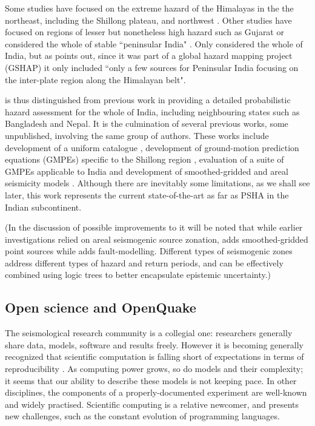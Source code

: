 \documentclass{article}
\begin{document}
Some studies have focused on the extreme hazard of the Himalayas \citep{Bilham2001} in the the northeast, including the Shillong plateau, \citep{Das2006} and northwest \citep{Mahajan2009}.
Other studies have focused on regions of lesser but nonetheless high hazard such as Gujarat \citep{Yadav2008} or considered the whole of stable ``peninsular India" \citep{jaiswal2007, ashish2016probabilistic}.
Only \cite{bhatia1999probabilistic} considered the whole of India, but as \cite{ashish2016probabilistic} points out, since it was part of a global hazard mapping project (GSHAP) it only included ``only a few sources for Peninsular India focusing on the inter-plate
region along the Himalayan belt".

\cite{nath2012probabilistic} is thus distinguished from previous work in providing a detailed probabilistic hazard assessment for the whole of India, including neighbouring states such as Bangladesh and Nepal.
It is the culmination of several previous works, some unpublished, involving the same group of authors.
These works include development of a uniform catalogue \citep{nath2010earthquake}, development of ground-motion prediction equations (GMPEs) specific to the Shillong region \citep{nath2012ground}, evaluation of a suite of GMPEs applicable to India \citep{nath2011peak} and development of smoothed-gridded and areal seismicity models \citep{thingbaijam2011seismogenic}.
Although there are inevitably some limitations, as we shall see later, this work represents the current state-of-the-art as far as PSHA in the Indian subcontinent.

(In the discussion of possible improvements to \cite{nath2012probabilistic} it will be noted that while earlier investigations \citep{bhatia1999probabilistic, Das2006, Yadav2008, jaiswal2007} relied on areal seismogenic source zonation, \cite{nath2012probabilistic} adds smoothed-gridded point sources while \cite{ashish2016probabilistic} adds fault-modelling.
Different types of seismogenic zones address different types of hazard and return periods, and can be effectively combined using logic trees to better encapsulate epistemic uncertainty.)

\subsection{Open science and OpenQuake}
\label{subsec:Open}

The seismological research community is a collegial one: researchers generally share data, models, software and results freely.
However it is becoming generally recognized that scientific computation is falling short of expectations in terms of reproducibility \citep{fomel2009reproducible, donoho2009reproducible}.
As computing power grows, so do models and their complexity; it seems that our ability to describe these models is not keeping pace.
In other disciplines, the components of a properly-documented experiment are well-known and widely practised.
Scientific computing is a relative newcomer, and presents new challenges, such as the constant evolution of programming languages.
\end{document}
